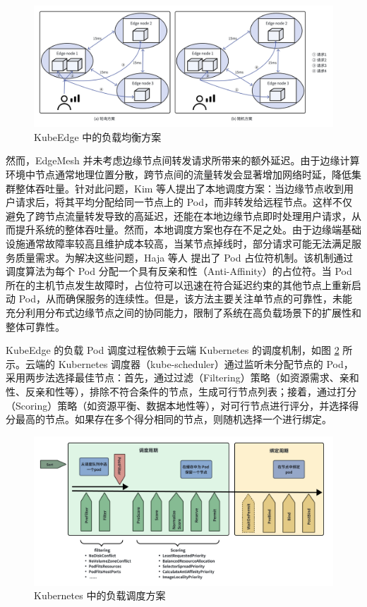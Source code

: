 \begin{figure}[ht]
  \centering
  \includegraphics[width=\linewidth]{pics/2-3edgemesh.png}
  \caption{KubeEdge 中的负载均衡方案}
  \label{fig:2-3edgemesh}
\end{figure}

然而，EdgeMesh 并未考虑边缘节点间转发请求所带来的额外延迟。由于边缘计算环境中节点通常地理位置分散，跨节点间的流量转发会显著增加网络时延，降低集群整体吞吐量。针对此问题，Kim 等人\cite{kim2023local}提出了本地调度方案：当边缘节点收到用户请求后，将其平均分配给同一节点上的 Pod，而非转发给远程节点。这样不仅避免了跨节点流量转发导致的高延迟，还能在本地边缘节点即时处理用户请求，从而提升系统的整体吞吐量。然而，本地调度方案也存在不足之处。由于边缘端基础设施通常故障率较高且维护成本较高，当某节点掉线时，部分请求可能无法满足服务质量需求。为解决这些问题，Haja 等人\cite{haja2019sharpening} 提出了 Pod 占位符机制。该机制通过调度算法为每个 Pod 分配一个具有反亲和性（Anti-Affinity）的占位符。当 Pod 所在的主机节点发生故障时，占位符可以迅速在符合延迟约束的其他节点上重新启动 Pod，从而确保服务的连续性。但是，该方法主要关注单节点的可靠性，未能充分利用分布式边缘节点之间的协同能力，限制了系统在高负载场景下的扩展性和整体可靠性。

KubeEdge 的负载 Pod 调度过程依赖于云端 Kubernetes 的调度机制，如图 \ref{fig:2-4k8sschedule} 所示。云端的 Kubernetes 调度器（kube-scheduler）通过监听未分配节点的 Pod，采用两步法选择最佳节点：首先，通过过滤（Filtering）策略（如资源需求、亲和性、反亲和性等），排除不符合条件的节点，生成可行节点列表；接着，通过打分（Scoring）策略（如资源平衡、数据本地性等），对可行节点进行评分，并选择得分最高的节点。如果存在多个得分相同的节点，则随机选择一个进行绑定。

\begin{figure}[ht]
  \centering
  \includegraphics[width=\linewidth]{pics/2-4k8sschedule.png}
  \caption{Kubernetes 中的负载调度方案}
  \label{fig:2-4k8sschedule}
\end{figure}

